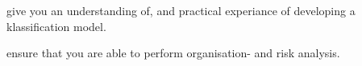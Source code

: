 \item give you an understanding of, and practical experiance of developing a
klassification model.
\item ensure that you are able to perform organisation- and risk analysis.
